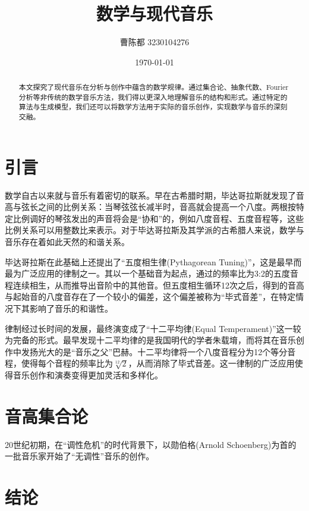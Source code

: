 \documentclass{article}
\title{\textbf{数学与现代音乐}}
\author{曹陈都 3230104276}
\date{\today}
\begin{document}
\maketitle

\begin{abstract}
\label{abstract}
本文探究了现代音乐在分析与创作中蕴含的数学规律。通过集合论、抽象代数、Fourier 分析等非传统的数学音乐方法，我们得以更深入地理解音乐的结构和形式。通过特定的算法与生成模型，我们还可以将数学方法用于实际的音乐创作，实现数学与音乐的深刻交融。
\end{abstract}

\section{引言}
\label{sec:introduction}
数学自古以来就与音乐有着密切的联系。早在古希腊时期，毕达哥拉斯就发现了音高与弦长之间的比例关系：当琴弦弦长减半时，音高就会提高一个八度\cite{math_history_2017}。两根按特定比例调好的琴弦发出的声音将会是“协和”的，例如八度音程、五度音程等，这些比例关系可以用整数比来表示。对于毕达哥拉斯及其学派的古希腊人来说，数学与音乐存在着如此天然的和谐关系。

毕达哥拉斯在此基础上还提出了“五度相生律(Pythagorean Tuning)”，这是最早而最为广泛应用的律制之一。其以一个基础音为起点，通过的频率比为3:2的五度音程连续相生，从而推导出音阶中的其他音。但五度相生循环12次之后，得到的音高与起始音的八度音存在了一个较小的偏差，这个偏差被称为“毕式音差”，在特定情况下其影响了音乐的和谐性。

律制经过长时间的发展，最终演变成了“十二平均律(Equal Temperament)”这一较为完备的形式。最早发现十二平均律的是我国明代的学者朱载堉，而将其在音乐创作中发扬光大的是“音乐之父”巴赫。十二平均律将一个八度音程分为12个等分音程，使得每个音程的频率比为$\sqrt[12]{2}$，从而消除了毕式音差。这一律制的广泛应用使得音乐创作和演奏变得更加灵活和多样化\cite{math_art_2021}。

\section{音高集合论}
\label{sec:pitch_set_theory}
20世纪初期，在“调性危机”的时代背景下，以勋伯格(Arnold Schoenberg)为首的一批音乐家开始了“无调性”音乐的创作。

\section{结论}



\end{document}
